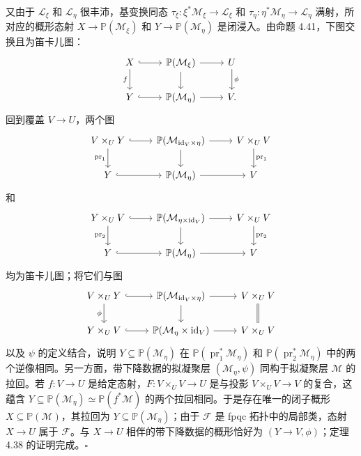 又由于 $\mathcal L_\xi$ 和 $\mathcal L_\eta$ 很丰沛，基变换同态 $\tau_\xi\colon\xi^*\mathcal M_\xi\to\mathcal L_\xi$ 和 $\tau_\eta\colon\eta^*\mathcal M_\eta\to\mathcal L_\eta$ 满射，所对应的概形态射 $X\to\mathbb P(\mathcal M_\xi)$ 和 $Y\to\mathbb P(\mathcal M_\eta)$ 是闭浸入。由命题 4.41，下图交换且为笛卡儿图：
\[
\begin{tikzcd}
 X\arrow[r,hook]\arrow[d,"{f}"']&\mathbb P(\mathcal M_\xi)\arrow[r]\arrow[d]&U\arrow[d,"{\phi}"]\\
 Y\arrow[r,hook]&\mathbb P(\mathcal M_\eta)\arrow[r]&V.
\end{tikzcd}
\]
回到覆盖 $V\to U$，两个图
\[
\begin{tikzcd}
 V\times_U Y\arrow[r,hook]\arrow[d,"{\operatorname{pr}_1}"']&\mathbb P(\mathcal M_{\id_V\times\eta})\arrow[r]\arrow[d]&V\times_U V\arrow[d,"{\operatorname{pr}_1}"]\\
 Y\arrow[r,hook]&\mathbb P(\mathcal M_\eta)\arrow[r]&V
\end{tikzcd}
\]
和
\[
\begin{tikzcd}
 Y\times_U V\arrow[r,hook]\arrow[d,"{\operatorname{pr}_2}"']&\mathbb P(\mathcal M_{\eta\times\id_V})\arrow[r]\arrow[d]&V\times_U V\arrow[d,"{\operatorname{pr}_2}"]\\
 Y\arrow[r,hook]&\mathbb P(\mathcal M_\eta)\arrow[r]&V
\end{tikzcd}
\]
均为笛卡儿图；将它们与图
\[
\begin{tikzcd}
 V\times_U Y\arrow[r,hook]\arrow[d,"{\phi}"']&\mathbb P(\mathcal M_{\id_V\times\eta})\arrow[r]\arrow[d]&V\times_U V\arrow[d,equal]\\
 Y\times_U V\arrow[r,hook]&\mathbb P(\mathcal M_\eta\times\id_V)\arrow[r]&V\times_U V
\end{tikzcd}
\]
以及 $\psi$ 的定义结合，说明 $Y\subseteq\mathbb P(\mathcal M_\eta)$ 在 $\mathbb P(\operatorname{pr}_1^*\mathcal M_\eta)$ 和 $\mathbb P(\operatorname{pr}_2^*\mathcal M_\eta)$ 中的两个逆像相同。另一方面，带下降数据的拟凝聚层 $(\mathcal M_\eta,\psi)$ 同构于拟凝聚层 $\mathcal M$ 的拉回。若 $f\colon V\to U$ 是给定态射，$F\colon V\times_U V\to U$ 是与投影 $V\times_U V\to V$ 的复合，这蕴含 $Y\subseteq\mathbb P(\mathcal M_\eta)\simeq\mathbb P(f^*\mathcal M)$ 的两个拉回相同。于是存在唯一的闭子概形 $X\subseteq\mathbb P(\mathcal M)$，其拉回为 $Y\subseteq\mathbb P(\mathcal M_\eta)$；由于 $\mathcal F$ 是 fpqc 拓扑中的局部类，态射 $X\to U$ 属于 $\mathcal F$。与 $X\to U$ 相伴的带下降数据的概形恰好为 $(Y\to V,\phi)$；定理 4.38 的证明完成。\hfill$\square$

